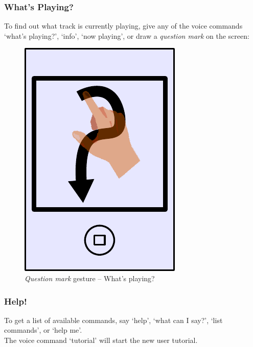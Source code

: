 \documentclass[12pt,letterpaper]{article}
\begin{document}
\subsubsection*{What's Playing?}
To find out what track is currently playing, give any of the voice commands `what's playing?', `info', `now playing',  or draw a \emph{question mark} on the screen:
\begin{figure}[H]
	\centering
	\includegraphics[scale=0.6]{question}
	\caption{\emph{Question mark} gesture -- What's playing?}
\end{figure}
\subsubsection*{Help!}
To get a list of available commands, say `help', `what can I say?', `list commands', or `help me'. \\
The voice command `tutorial' will start the new user tutorial.
\end{document}
